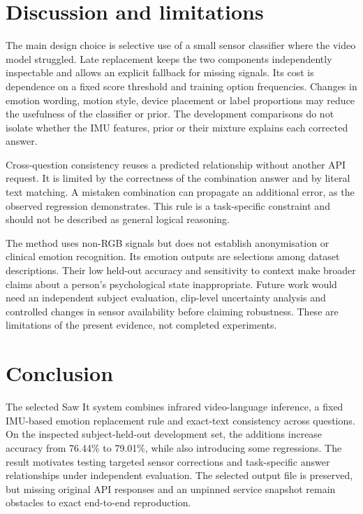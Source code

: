 \documentclass[12pt,a4paper]{article}
\begin{document}
\section{Discussion and limitations}
The main design choice is selective use of a small sensor classifier where the video model struggled. Late replacement keeps the two components independently inspectable and allows an explicit fallback for missing signals. Its cost is dependence on a fixed score threshold and training option frequencies. Changes in emotion wording, motion style, device placement or label proportions may reduce the usefulness of the classifier or prior. The development comparisons do not isolate whether the IMU features, prior or their mixture explains each corrected answer.

Cross-question consistency reuses a predicted relationship without another API request. It is limited by the correctness of the combination answer and by literal text matching. A mistaken combination can propagate an additional error, as the observed regression demonstrates. This rule is a task-specific constraint and should not be described as general logical reasoning.

The method uses non-RGB signals but does not establish anonymisation or clinical emotion recognition. Its emotion outputs are selections among dataset descriptions. Their low held-out accuracy and sensitivity to context make broader claims about a person's psychological state inappropriate. Future work would need an independent subject evaluation, clip-level uncertainty analysis and controlled changes in sensor availability before claiming robustness. These are limitations of the present evidence, not completed experiments.

\section{Conclusion}
The selected Saw It system combines infrared video-language inference, a fixed IMU-based emotion replacement rule and exact-text consistency across questions. On the inspected subject-held-out development set, the additions increase accuracy from 76.44\% to 79.01\%, while also introducing some regressions. The result motivates testing targeted sensor corrections and task-specific answer relationships under independent evaluation. The selected output file is preserved, but missing original API responses and an unpinned service snapshot remain obstacles to exact end-to-end reproduction.
\end{document}
